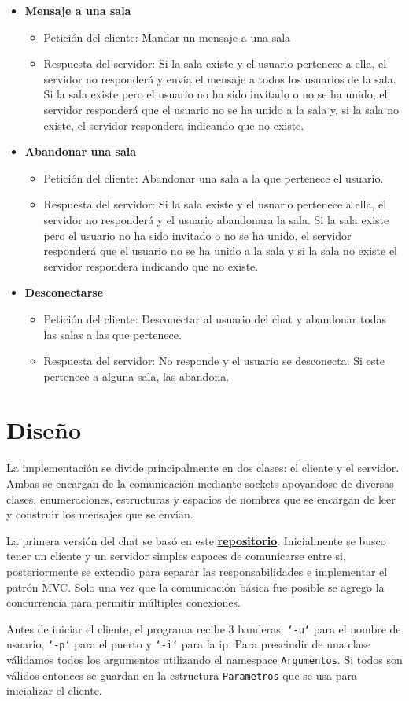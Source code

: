 \documentclass[12pt]{article}  %
\newcommand{\newItem}[3]{
  \item {\color{maincolor}\textbf{#1}}
    \begin{itemize}
      \item {\fontseries{b}\selectfont Petición del cliente:} #2
      \item {\fontseries{b}\selectfont Respuesta del servidor:} #3
    \end{itemize}
}
\begin{document}
\begin{itemize}
{        sala existe pero el usuario no ha sido invitado o no se ha unido, el
        servidor responderá que el usuario no se ha unido a la sala y, si la sala
        no existe, el servidor respondera indicando que no existe.}
    \newItem{Mensaje a una sala}{Mandar un mensaje a una sala}{Si la sala existe
        y el usuario pertenece a ella, el servidor no responderá y envía el
        mensaje a todos los usuarios de la sala. Si la sala existe pero el
        usuario no ha sido invitado o no se ha unido, el servidor responderá que
        el usuario no se ha unido a la sala y, si la sala no existe, el servidor
        respondera indicando que no existe.}
    \newItem{Abandonar una sala}{Abandonar una sala a la que pertenece el
        usuario.}{Si la sala existe y el usuario pertenece a ella, el servidor no
        responderá y el usuario abandonara la sala. Si la sala existe pero el
        usuario no ha sido invitado o no se ha unido, el servidor responderá que
        el usuario no se ha unido a la sala y si la sala no existe el servidor
        respondera indicando que no existe.}
    \newItem{Desconectarse}{Desconectar al usuario del chat y abandonar todas
        las salas a las que pertenece.}{No responde y el usuario se
        desconecta. Si este pertenece a alguna sala, las abandona.}
\end{itemize}

\section*{Diseño}

La implementación se divide principalmente en dos clases: el cliente y el
servidor. Ambas se encargan de la comunicación mediante sockets apoyandose de
diversas clases, enumeraciones, estructuras y espacios de nombres que se
encargan de leer y construir los mensajes que se envían.

La primera versión del chat se basó en este
\href{https://github.com/HolyLu/tcp-server-}{\color{maincolor}\textbf{repositorio}}.
Inicialmente se busco tener un cliente y un servidor simples capaces de comunicarse
entre si, posteriormente se extendio para separar las responsabilidades e
implementar el patrón MVC. Solo una vez que la comunicación básica fue posible se
agrego la concurrencia para permitir múltiples conexiones.

Antes de iniciar el cliente, el programa recibe 3 banderas: \texttt{`-u`} para
el nombre de usuario, \texttt{`-p`} para el puerto y \texttt{`-i`} para la ip.
Para prescindir de una clase válidamos todos los argumentos utilizando el
namespace \texttt{Argumentos}. Si todos son válidos entonces se guardan en la
estructura \texttt{Parametros} que se usa para inicializar el cliente.
\end{document}
